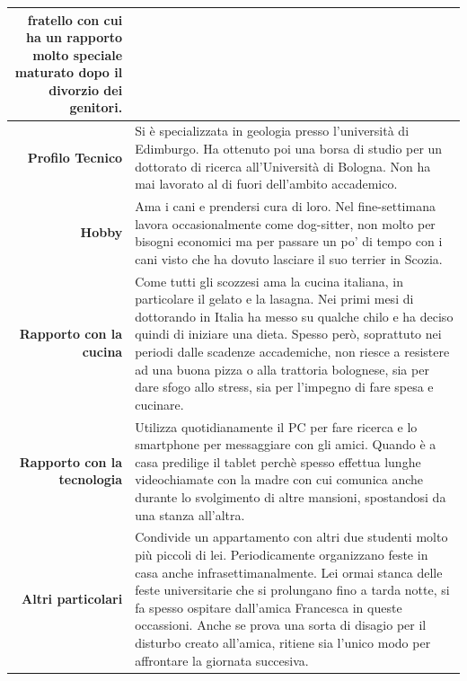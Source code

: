\begin{table}[H]
\begin{centering}
\begin{tabular} { | r  p{10cm} | }
{fratello con cui ha un rapporto molto speciale maturato dopo il
divorzio dei genitori.} \\
\hline
		\textbf{Profilo Tecnico} & Si è specializzata in geologia presso
l'università di Edimburgo. Ha ottenuto poi una borsa di studio per un
dottorato di ricerca all'Università di Bologna. Non ha mai lavorato al
di fuori dell'ambito accademico.\\ \hline
		\textbf{Hobby} & Ama i cani e prendersi cura di loro. Nel
fine-settimana lavora occasionalmente come dog-sitter, non molto per
bisogni economici ma per passare un po' di tempo con i cani visto che ha
dovuto lasciare il suo terrier in Scozia. \\\hline
		\textbf{Rapporto con la cucina} & Come tutti gli scozzesi ama
la cucina italiana, in particolare il gelato e la lasagna. Nei
primi mesi di dottorando in Italia ha messo su qualche chilo e ha deciso
quindi di iniziare una dieta. Spesso però, soprattuto nei periodi dalle
scadenze accademiche, non riesce a resistere ad una buona pizza o alla
trattoria bolognese,
sia per dare sfogo allo stress, sia per l'impegno di fare spesa e
cucinare.\\ \hline
		\textbf{Rapporto con la tecnologia} & Utilizza quotidianamente
il PC per fare ricerca e lo smartphone per messaggiare con gli amici.
Quando è a casa predilige il tablet perchè spesso effettua lunghe
videochiamate con la madre con cui comunica anche durante lo svolgimento
di altre mansioni, spostandosi da una stanza all'altra.\\ \hline
		\textbf{Altri particolari} & Condivide un appartamento con altri
due studenti molto più piccoli di lei. Periodicamente organizzano feste
in casa anche infrasettimanalmente. Lei ormai stanca delle feste
universitarie che si prolungano fino a tarda notte, si fa spesso ospitare
dall'amica Francesca in queste occassioni. Anche se prova una sorta di disagio per il
disturbo creato all'amica, ritiene sia l'unico modo per affrontare la giornata
succesiva.\\ \hline
	\end{tabular}
	\end{centering}
\end{table}

